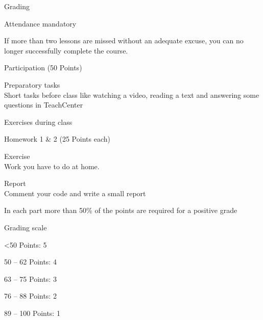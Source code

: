 \documentclass[aspectratio=169]{beamer}
\begin{document}
\begin{frame}{Grading}
    \vspace{-0.5cm}
        \begin{minipage}[t]{0.49\textwidth}
            \begin{tugitemize}
                \item Attendance mandatory
                \begin{tugitemize}
                    \item If more than two lessons are missed without an adequate excuse, you can no longer successfully complete the course.
                \end{tugitemize}
                \item Participation (50 Points)
                \begin{tugitemize}
                    \item Preparatory tasks\\
                    Short tasks before class like watching a video, reading a text and answering some questions in TeachCenter
                    \item Exercises during class
                \end{tugitemize}
                \item Homework 1 \& 2 (25 Points each)
                \begin{tugitemize}
                    \item Exercise\\
                    Work you have to do at home.
                    \item Report\\
                    Comment your code and write a small report
                \end{tugitemize}
            \end{tugitemize}
        \end{minipage}
        \hfill
        \begin{minipage}[t]{0.49\textwidth}
            \begin{tugitemize}
                \item In each part more than 50\% of the points are required for a positive grade
                \item Grading scale
                \begin{tugitemize}
                    \item \textless50 Points: 5
                    \item 50 – 62 Points: 4
                    \item 63 – 75 Points: 3
                    \item 76 – 88 Points: 2
                    \item 89 – 100 Points: 1
                \end{tugitemize}
            \end{tugitemize}
        \end{minipage}
    
\end{frame}
\end{document}
